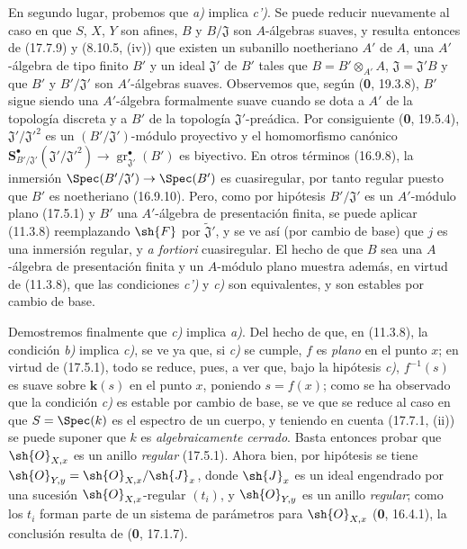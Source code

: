 En segundo lugar, probemos que \emph{a)} implica \emph{c')}. Se puede reducir nuevamente al caso en que $S$, $X$, $Y$ son afines, $B$ y $B/\mathfrak J$ son $A$-álgebras suaves, y resulta entonces de (17.7.9) y (8.10.5, (iv)) que existen un subanillo noetheriano $A'$ de $A$, una $A'$-álgebra de tipo finito $B'$ y un ideal $\mathfrak J'$ de $B'$ tales que $B=B'\otimes_{A'}A$, $\mathfrak J=\mathfrak J'B$ y que $B'$ y $B'/\mathfrak J'$ son $A'$-álgebras suaves. Observemos que, según (\textbf 0, 19.3.8), $B'$ sigue siendo una $A'$-álgebra formalmente suave cuando se dota a $A'$ de la topología discreta y a $B'$ de la topología $\mathfrak J'$-preádica. Por consiguiente (\textbf 0, 19.5.4), $\mathfrak J'/\mathfrak J'^2$ es un $(B'/\mathfrak J')$-módulo proyectivo y el homomorfismo canónico
$\mathbf{S}^{\bullet}_{B'/\mathfrak J'}(\mathfrak J'/\mathfrak J'^2)\to\operatorname{gr}_{\mathfrak J'}^{\bullet}(B')$
es biyectivo. En otros términos (16.9.8), la inmersión $\Spec(B'/\mathfrak J')\to\Spec(B')$ es cuasiregular, por tanto regular puesto que $B'$ es noetheriano (16.9.10). Pero, como por hipótesis $B'/\mathfrak J'$ es un $A'$-módulo plano (17.5.1) y $B'$ una $A'$-álgebra de presentación finita, se puede aplicar (11.3.8) reemplazando $\sh{F}$ por $\widetilde{\mathfrak J}'$, y se ve así (por cambio de base) que $j$ es una inmersión regular, y \emph{a fortiori} cuasiregular. El hecho de que $B$ sea una $A$-álgebra de presentación finita y un $A$-módulo plano muestra además, en virtud de (11.3.8), que las condiciones \emph{c')} y \emph{c)} son equivalentes, y son estables por cambio de base.

Demostremos finalmente que \emph{c)} implica \emph{a)}. Del hecho de que, en (11.3.8), la condición \emph{b)} implica \emph{c)}, se ve ya que, si \emph{c)} se cumple, $f$ es \emph{plano} en el punto $x$; en virtud de (17.5.1), todo se reduce, pues, a ver que, bajo la hipótesis \emph{c)}, $f^{-1}(s)$ es suave sobre $\boldsymbol{k}(s)$ en el punto $x$, poniendo $s=f(x)$; como se ha observado que la condición \emph{c)} es estable por cambio de base, se ve que se reduce al caso en que $S=\Spec(k)$ es el espectro de un cuerpo, y teniendo en cuenta (17.7.1, (ii)) se puede suponer que $k$ es \emph{algebraicamente cerrado}. Basta entonces probar que $\sh{O}_{X,x}$ es un anillo \emph{regular} (17.5.1). Ahora bien, por hipótesis se tiene $\sh{O}_{Y,y}=\sh{O}_{X,x}/\sh{J}_x$, donde $\sh{J}_x$ es un ideal engendrado por una sucesión $\sh{O}_{X,x}$-regular $(t_i)$, y $\sh{O}_{Y,y}$ es un anillo \emph{regular}; como los $t_i$ forman parte de un sistema de parámetros para $\sh{O}_{X,x}$ (\textbf 0, 16.4.1), la conclusión resulta de (\textbf 0, 17.1.7).

